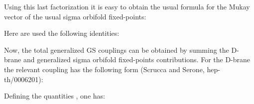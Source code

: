 \documentclass[a4paper,a4paper]{article}
\begin{document}
Using this last factorization it is easy to obtain the usual formula for the Mukay vector of the usual sigma orbifold fixed-points:

\begin{center}
{  \coordHE{} }
\end{center} 
Here are used the following identities:

\begin{center}
 
{  \coordHE{}}
\end{center}

\begin{center}
 
{  \coordHE{}}
\end{center}

Now, the  total generalized GS couplings can be obtained by summing the D-brane and generalized sigma orbifold fixed-points contributions.  For the D-brane the relevant coupling has the following form (Scrucca and Serone, hep-th/0006201):

\begin{center}
{  \coordHE{} }
\end{center}

Defining the quantities \coordHE{}, one has:
\begin{center}
{  \coordHE{} }
\end{center}
\end{document}

